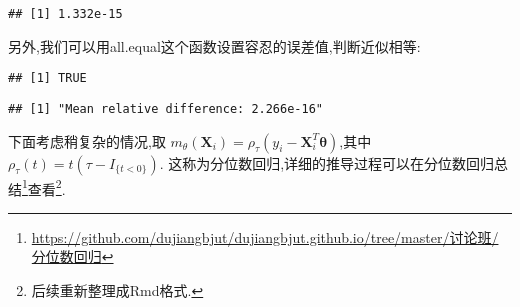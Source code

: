 \documentclass[]{ctexbook}
\newenvironment{Shaded}{\begin{snugshade}}{\end{snugshade}}
\newcommand{\DataTypeTok}[1]{\textcolor[rgb]{0.13,0.29,0.53}{#1}}
\newcommand{\DecValTok}[1]{\textcolor[rgb]{0.00,0.00,0.81}{#1}}
\newcommand{\FloatTok}[1]{\textcolor[rgb]{0.00,0.00,0.81}{#1}}
\newcommand{\KeywordTok}[1]{\textcolor[rgb]{0.13,0.29,0.53}{\textbf{#1}}}
\newcommand{\NormalTok}[1]{#1}
\newcommand{\OperatorTok}[1]{\textcolor[rgb]{0.81,0.36,0.00}{\textbf{#1}}}
\renewcommand{\href}[2]{#2\footnote{\url{#1}}}
\begin{document}
\begin{verbatim}
## [1] 1.332e-15
\end{verbatim}

另外,我们可以用all.equal这个函数设置容忍的误差值,判断近似相等:

\begin{Shaded}
\end{Shaded}

\begin{verbatim}
## [1] TRUE
\end{verbatim}

\begin{Shaded}
\end{Shaded}

\begin{verbatim}
## [1] "Mean relative difference: 2.266e-16"
\end{verbatim}

下面考虑稍复杂的情况,取
\(m_{\theta}\left(\boldsymbol{X}_{i}\right)=\rho_{\tau}\left(y_{i}-\boldsymbol{X}_{i}^{T} \boldsymbol{\theta}\right)\),其中
\(\rho_{\tau}(t)=t\left(\tau-I_{\{t<0\}}\right)\).
这称为分位数回归,详细的推导过程可以在\href{https://github.com/dujiangbjut/dujiangbjut.github.io/tree/master/讨论班/分位数回归}{分位数回归总结}查看\footnote{后续重新整理成Rmd格式.}.
\end{document}
